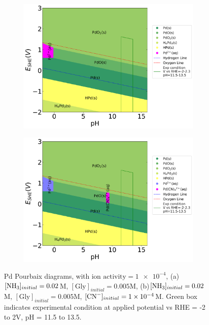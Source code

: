 \documentclass[journal=jacsat,manuscript=article]{achemso}
\begin{document}
\begin{figure}[htbp]
    \centering
    \begin{subfigure}[b]{0.45\textwidth}
        \subcaption{}\label{fig:Pd_Pourbaix_NH3_Gly}
        \includegraphics[width=\textwidth]{Figures/pourbaix_diagrams/Pd-NH3-H2O_activity=1e-04_[NH3]=0.02M_[Gly]=0.005M_[CN]=0.png}
        \par\medskip
    \end{subfigure}
    \begin{subfigure}[b]{0.45\textwidth}
        \subcaption{}\label{fig:Pd_Pourbaix_NH3_Gly_CN}
        \includegraphics[width=\textwidth]{Figures/pourbaix_diagrams/Pd-NH3-H2O_activity=1e-04_[NH3]=0.02M_[Gly]=0.005M_[CN]=0.0001.png}
        \par\medskip   
    \end{subfigure}

    \caption{Pd Pourbaix diagrams, with $\text{ion activity}=\num{1e-4}$, (a)$[\ce{NH3}]_{initial}= 0.02$M, $[\text{Gly}]_{initial}=0.005$M, (b)$[\ce{NH3}]_{initial}= 0.02$M, $[\text{Gly}]_{initial}=0.005$M,  $[\ce{CN-}]_{initial}=\num{1e-4}$M. Green box indicates experimental condition at applied potential vs RHE = -2 to 2V, pH = 11.5 to 13.5.}
    \label{fig:Pd_Pourbaix}
\end{figure}
\end{document}
